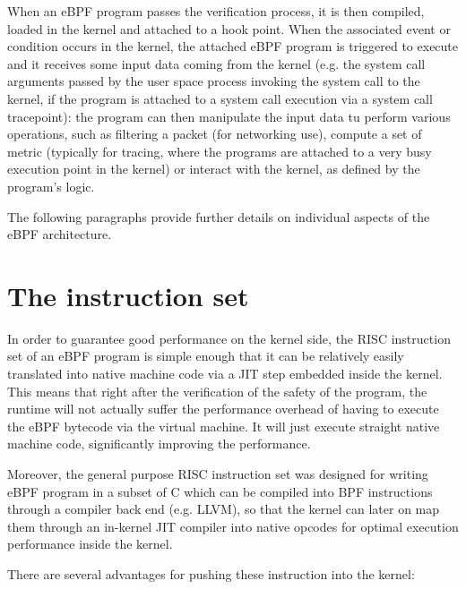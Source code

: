 When an eBPF program passes the verification process, it is then compiled, loaded in the kernel and attached to a hook point.
When the associated event or condition occurs in the kernel, the attached eBPF program is triggered to execute and it receives some input data coming from the kernel (e.g. the system call arguments passed by the user space process invoking the system call to the kernel, if the program is attached to a system call execution via a system call tracepoint): the program can then manipulate the input data tu perform various operations, such as filtering a packet (for networking use), compute a set of metric (typically for tracing, where the programs are attached to a very busy execution point in the kernel) or interact with the kernel, as defined by the program's logic.

The following paragraphs provide further details on individual aspects of the eBPF architecture.

\section{The instruction set}

In order to guarantee good performance on the kernel side, the RISC instruction set of an eBPF program is simple enough that it can be relatively easily translated into native machine code via a JIT step embedded inside the kernel. 
This means that right after the verification of the safety of the program, the runtime will not actually suffer the performance overhead of having to execute the eBPF bytecode via the virtual machine. 
It will just execute straight native machine code, significantly improving the performance.

Moreover, the general purpose RISC instruction set was designed for writing eBPF program in a subset of C which can be compiled into BPF instructions through a compiler back end (e.g. LLVM), so that the kernel can later on map them through an in-kernel JIT compiler into native opcodes for optimal execution performance inside the kernel.

There are several advantages for pushing these instruction into the kernel:

